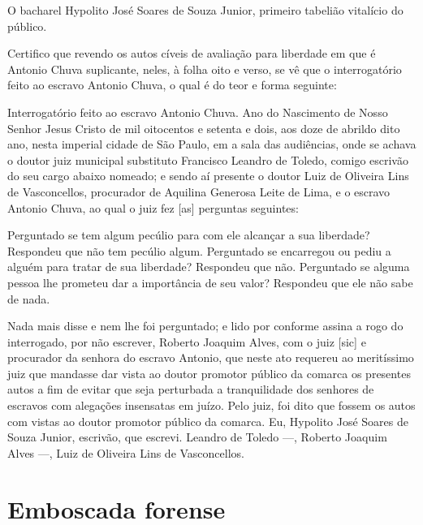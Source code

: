 \asterisc{}

O bacharel Hypolito José Soares de Souza Junior, primeiro tabelião
vitalício do público.

Certifico que revendo os autos cíveis de avaliação para liberdade em que
é Antonio Chuva suplicante, neles, à folha oito e verso, se vê que o
interrogatório feito ao escravo Antonio Chuva, o qual é do teor e forma
seguinte:

Interrogatório feito ao escravo Antonio Chuva. Ano do Nascimento de
Nosso Senhor Jesus Cristo de mil oitocentos e setenta e dois, aos doze
de abrildo dito ano, nesta imperial cidade de São Paulo, em a sala das
audiências, onde se achava o doutor juiz municipal substituto Francisco
Leandro de Toledo, comigo escrivão do seu cargo abaixo nomeado; e sendo
aí presente o doutor Luiz de Oliveira Lins de Vasconcellos, procurador
de Aquilina Generosa Leite de Lima, e o escravo Antonio Chuva, ao qual o
juiz fez {[}as{]} perguntas seguintes:

Perguntado se tem algum pecúlio para com ele alcançar a sua liberdade?
Respondeu que não tem pecúlio algum. Perguntado se encarregou ou pediu a
alguém para tratar de sua liberdade? Respondeu que não. Perguntado se
alguma pessoa lhe prometeu dar a importância de seu valor? Respondeu que
ele não sabe de nada.

Nada mais disse e nem lhe foi perguntado; e lido por conforme assina a
rogo do interrogado, por não escrever, Roberto Joaquim Alves, com o juiz
{[}sic{]} e procurador da senhora do escravo Antonio, que neste ato
requereu ao meritíssimo juiz que mandasse dar vista ao doutor promotor
público da comarca os presentes autos a fim de evitar que seja
perturbada a tranquilidade dos senhores de escravos com alegações
insensatas em juízo. Pelo juiz, foi dito que fossem os autos com vistas
ao doutor promotor público da comarca. Eu, Hypolito José Soares de Souza
Junior, escrivão, que escrevi. Leandro de Toledo ---, Roberto Joaquim
Alves ---, Luiz de Oliveira Lins de Vasconcellos.

\part{Emboscada forense}

